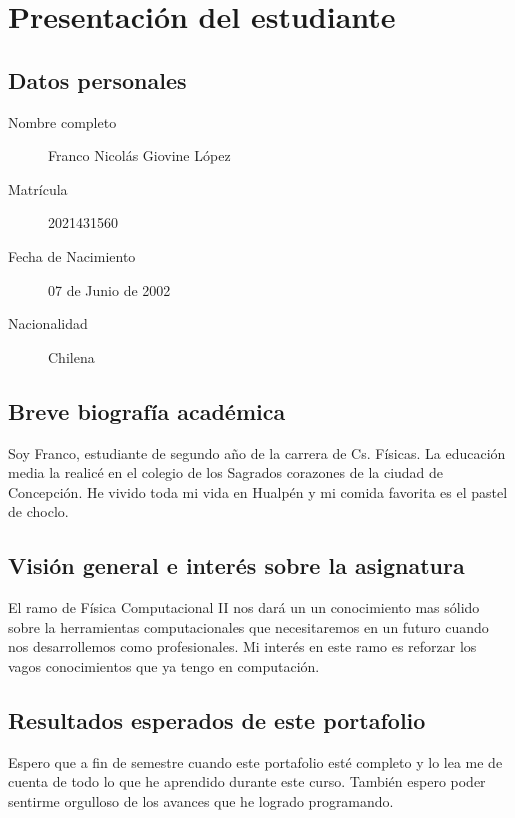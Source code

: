 \documentclass[../portafolio.tex]{subfiles}
\begin{document}
\chapter{Presentación del estudiante}


\section*{Datos personales}
\begin{description}
\item[{Nombre completo}] Franco Nicolás Giovine López  %
\item[{Matrícula}] 2021431560    %
\item[{Fecha de Nacimiento}] 07 de Junio de 2002   %
\item[{Nacionalidad}] Chilena
\end{description}


\section*{Breve biografía académica}
Soy Franco, estudiante de segundo año de la carrera de Cs. Físicas. La educación media la realicé en el colegio de los Sagrados corazones de
 la ciudad de Concepción. He vivido toda mi vida en Hualpén y mi comida favorita es el pastel de choclo.


\section*{Visión general e interés sobre la asignatura}
El ramo de Física Computacional II nos dará un un conocimiento mas sólido sobre la herramientas computacionales que necesitaremos en un futuro cuando nos 
desarrollemos como profesionales. Mi interés en este ramo es reforzar los vagos conocimientos que ya tengo en computación.


\section*{Resultados esperados de este portafolio}
Espero que a fin de semestre cuando este portafolio esté completo y lo lea  me de cuenta de todo lo que he aprendido durante este curso. También espero poder sentirme orgulloso de los avances que he logrado programando.
\end{document}
